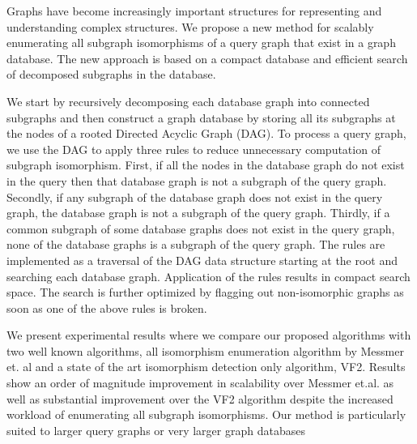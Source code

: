 
Graphs have become increasingly important structures for representing and understanding complex structures.
We propose a new method for scalably enumerating all subgraph isomorphisms of a query graph that exist in a graph database. The new approach is based on a compact database and efficient search of decomposed subgraphs in the database.

We start by recursively decomposing each database graph into connected subgraphs and then construct a graph database by storing all its subgraphs at the nodes of a rooted Directed Acyclic Graph (DAG). To process a query graph, we use the DAG to apply three rules to reduce unnecessary computation of subgraph isomorphism. First, if all the nodes in the database graph do not exist in the query then that database graph is not a subgraph of the query graph. Secondly, if any subgraph of the database graph does not exist in the query graph, the database graph is not a subgraph of the query graph. Thirdly, if a common subgraph of some database graphs does not exist in the query graph, none of the database graphs is a subgraph of the query graph. The rules are implemented as a traversal of the DAG data structure starting at the root and searching each database graph. Application of the rules results in compact search space. The search is further optimized by flagging out non-isomorphic graphs as soon as one of the above rules is broken. 

We present experimental results where we compare our proposed algorithms with two well known algorithms, all isomorphism enumeration algorithm by Messmer et. al and a state of the art isomorphism detection only algorithm, VF2. Results show an order of magnitude improvement in scalability over Messmer et.al. as well as substantial improvement over the VF2 algorithm despite the increased workload of enumerating all subgraph isomorphisms. Our method is particularly suited to larger query graphs or very larger graph databases


